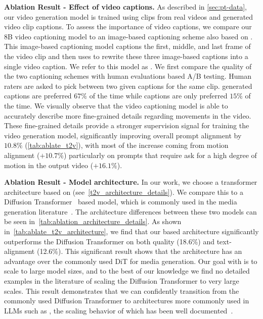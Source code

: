 \noindent\textbf{Ablation Result - Effect of video captions.}
As described in \ref{sec:pt-data}, our video generation model is trained using clips from real videos and \llamaVideo generated video clip captions.
To assess the importance of video captions, we compare our \llamaVideo 8B video captioning model to an image-based captioning scheme also based on \llamaNoVersion.
This image-based captioning model captions the first, middle, and last frame of the video clip and then uses \llamaNoVersion to rewrite these three image-based captions into a single video caption.
We refer to this model as \llamaRewrite.
We first compare the quality of the two captioning schemes with human evaluations based A/B testing.
Human raters are asked to pick between two given captions for the same clip.
\llamaVideo generated captions are preferred $67\%$ of the time while \llamaRewrite captions are only preferred $15\%$ of the time.
We visually observe that the video captioning model is able to accurately describe more fine-grained details regarding movements in the video.
These fine-grained details provide a stronger supervision signal for training the video generation model,
significantly improving overall prompt alignment by $10.8\%$ (\cref{tab:ablate_t2v}),
with most of the increase coming from motion alignment ($+10.7\%$) particularly on prompts that require ask for a high degree of motion in the output video ($+16.1\%$).

\noindent\textbf{Ablation Result - Model architecture.}
In our work, we choose a transformer architecture based on \llama (see~\cref{t2v_architecture_details}).
We compare this to a Diffusion Transformer~\citep{dit} based model, which is commonly used in the media generation literature~\citep{dit,sora,ma2024latte}.
The architecture differences between these two models can be seen in~\cref{tab:ablation_architecture_details}.
As shown in~\cref{tab:ablate_t2v_architecture}, we find that our \llama based architecture significantly outperforms the Diffusion Transformer on both quality (18.6\%) and text-alignment (12.6\%).
This significant result shows that the \llama architecture has an advantage over the commonly used DiT for media generation.
Our goal with \OURS is to scale to large model sizes, and to the best of our knowledge we find no detailed examples in the literature of scaling the Diffusion Transformer to very large scales.
This result demonstrates that we can confidently transition from the commonly used Diffusion Transformer to architectures more commonly used in LLMs such as \llama, the scaling behavior of which has been well documented~\citep{llama2,llama3}.

